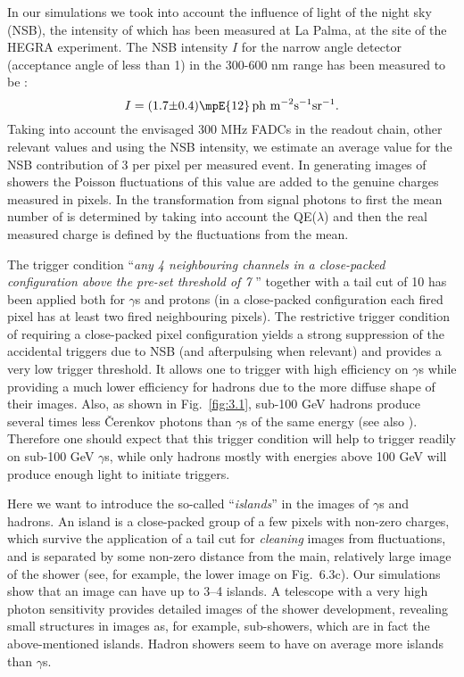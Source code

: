 In our simulations we took into account
the influence of light of the night sky (NSB),
the intensity of which has been measured at La Palma, at
the site of the HEGRA experiment. The NSB intensity $I$ for the narrow
angle detector (acceptance angle of less than 1\tdeg) in the 
300-600 nm
range has been measured to be \cite{mirzoyan:94}:
\begin{equation}
I = (1.7{\pm}0.4)\mpE{12} \,{\rm ph~m}^{-2} {\rm s}^{-1} {\rm sr}^{-1}.
\end{equation}
Taking into account the envisaged 300 MHz FADCs
in the readout chain, other relevant values and using
the NSB intensity, we estimate an average value for the NSB
contribution of 3 \phes per pixel per measured event. In generating
images of showers the Poisson fluctuations of this
value are added to the genuine charges measured in pixels. In the
transformation from signal photons to \phes first the mean number of
\phes is determined by taking into account the QE($\lambda$) and then
the real measured charge is defined by the fluctuations from the mean.

The trigger condition ``{\sl any 4 neighbouring channels in a close-packed
configuration
above the pre-set threshold of 7 \phes}'' together
with a tail cut of 10 \phes has been applied both for $\gamma$s and
protons (in a close-packed configuration each fired
pixel has at least two fired neighbouring pixels). The restrictive trigger condition
of requiring a close-packed pixel configuration yields a strong
suppression of
the accidental triggers due to NSB (and afterpulsing when relevant)
and provides a very low trigger threshold. It allows one to trigger with high
efficiency on $\gamma$s while providing a much lower efficiency for
hadrons due to the more diffuse shape of their images. Also, as
shown in Fig.~\ref{fig:3.1},
sub-100 GeV hadrons produce several times less \v{C}erenkov
photons than $\gamma$s of the same energy (see
also \cite{weekes:77}).
Therefore one should expect that this trigger
condition will help to trigger readily on sub-100 GeV $\gamma$s, while
only
hadrons mostly with energies above 100 GeV will produce enough light
to initiate triggers.

Here we want to introduce the so-called ``{\sl islands}'' in the
images of $\gamma$s and hadrons. An island is a close-packed group of a
few pixels with non-zero charges, which survive the application
of a tail cut for {\sl cleaning} images from fluctuations, and 
is
separated by some non-zero distance from the main, relatively large
image of the shower (see, for example, the lower image on Fig.~6.3c).
Our simulations show that an image can have up to 3--4 islands. A
telescope with a very high photon sensitivity provides detailed images
of the shower development, revealing small structures in images as, for
example, sub-showers, which are in fact the above-mentioned islands.
Hadron showers seem to have on average more islands
than $\gamma$s.


